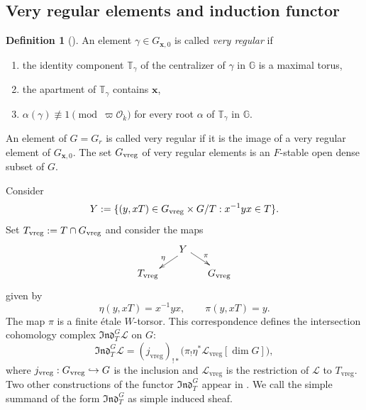 \documentclass[11pt,letterpaper]{amsart}
\def\brk{{\breve k}}
\def\g{\gamma}
\def\a{\alpha}
\theoremstyle{definition}
\newtheorem{definition}[theorem]{Definition}
\numberwithin{equation}{section}
\numberwithin{theorem}{section}
\begin{document}
\subsection{Very regular elements and induction functor}\label{tor}
\begin{definition}[{\cite{CI_MPDL}}]
  An element $\gamma\in G_{\mathbf{x},0}$ is called \textit{very regular} if
  \begin{enumerate}
    \item the identity component $\mathbb{T}_\g$ of the centralizer of $\g$ in $\mathbb{G}$ is a maximal torus,%
    \item the apartment of  $\mathbb{T}_\g$ contains $\mathbf{x}$,
    \item $\a(\g)\not\equiv1\pmod{\varpi\mathcal{O}_\brk}$ for every root $\a$ of $\mathbb{T}_\g$ in $\mathbb{G}$.
  \end{enumerate}

An element of $G=G_r$ is called very regular if it is the image of a
very regular element of $G_{\mathbf{x},0}$.  The set $G_{{\rm vreg}}$ of
very regular elements is an $F$-stable open dense subset of $G$.
\end{definition}

Consider 
\begin{equation*}
  Y := \{(y,xT) \in G_{ \rm vreg} \times G/T : x^{-1} y x \in T\}.
\end{equation*} 
Set $T_{\mathrm{vreg}}:=T\cap G_{\rm vreg}$ and consider the maps
\begin{equation*}
\xymatrix@R=10pt@C=15pt{
    & Y \ar@<2pt>[dl]_{\eta} \ar@<2pt>[dr]^{\pi} \\
    T_{\rm vreg} & & G_{\rm vreg}}
\end{equation*}
given by
\begin{equation*}
  \eta(y,xT) = x^{-1} y x, \qquad \pi(y,xT) = y.
\end{equation*}
The map $\pi$ is a finite étale $W$-torsor.  This correspondence defines
the intersection cohomology complex
$\mathfrak{Ind}^{G}_{T}\mathcal{L}$ on $G$:
\[
\mathfrak{Ind}^{G}_{T}\mathcal{L}
=(j_{\mathrm{vreg}})_{!*}
 \bigl(\pi_!\eta^*\mathcal{L}_{\mathrm{vreg}}[\dim G]\bigr),
\]
where $j_{{\rm vreg}}:G_{\rm vreg}\hookrightarrow G$ is the inclusion
and $\mathcal{L}_{\mathrm{vreg}}$ is the restriction of $\mathcal{L}$ to
$T_{\mathrm{vreg}}$.  Two other constructions of the functor
$\mathfrak{Ind}^{G}_{T}$ appear in \cite{BC24,INY25}. We call the simple summand of the form $\mathfrak{Ind}^{G}_{T}$ as simple induced sheaf.
\end{document}
